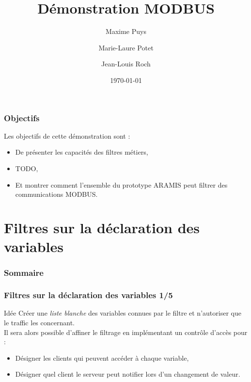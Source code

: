 \documentclass{beamer}
\title{Démonstration MODBUS}
\author[M Puys \and M-L Potet \and J-L Roch]{Maxime Puys \and Marie-Laure Potet \and Jean-Louis Roch}
\date{\today}
\begin{document}
\begin{frame}
    \maketitle
\end{frame}

\begin{frame}
    \frametitle{Objectifs}

    Les objectifs de cette démonstration sont :
    \begin{itemize}
        \item De présenter les capacités des filtres métiers,
        \item TODO,
        \item Et montrer comment l'ensemble du prototype ARAMIS peut filtrer des communications MODBUS.
    \end{itemize}
\end{frame}

\section{Filtres sur la déclaration des variables}

\begin{frame}
    \frametitle{Sommaire}

    \tableofcontents[currentsection]
\end{frame}

\begin{frame}
    \frametitle{Filtres sur la déclaration des variables 1/5}

    \begin{block}{Idée}
        Créer une {\em liste blanche} des variables connues par le filtre et n'autoriser que le traffic les concernant.\\
        Il sera alors possible d'affiner le filtrage en implémentant un contrôle d'accès pour :
        \begin{itemize}
            \item Désigner les clients qui peuvent accéder à chaque variable,
            \item Désigner quel client le serveur peut notifier lors d'un changement de valeur.
        \end{itemize}
    \end{block}
\end{frame}
\end{document}
